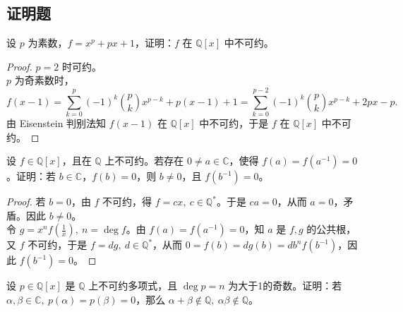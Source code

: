 \documentclass[lang=cn,12pt]{elegantbook}
\begin{document}
\subsection{证明题}
\begin{example}
    设 \( p \) 为素数，\( f = x^p + px + 1 \)，证明：\( f \) 在 \( \mathbb{Q}[x] \) 中不可约。
\end{example}

\begin{proof}
     \( p = 2 \) 时可约。\\
    \( p \) 为奇素数时，
    \[
    f(x-1) = \sum_{k=0}^{p}(-1)^k \binom{p}{k}x^{p-k} + p(x-1) + 1 = \sum_{k=0}^{p-2}(-1)^k \binom{p}{k}x^{p-k} + 2px - p.
    \]
    由 Eisenstein 判别法知 \( f(x-1) \) 在 \( \mathbb{Q}[x] \) 中不可约，于是 \( f \) 在 \( \mathbb{Q}[x] \) 中不可约。
\end{proof}

\begin{example}
    设 \( f \in \mathbb{Q}[x] \)，且在 \( \mathbb{Q} \) 上不可约。若存在 \( 0 \neq a \in \mathbb{C} \)，使得 \( f(a) = f(a^{-1}) = 0 \)。证明：若 \( b \in \mathbb{C} \)，\( f(b) = 0 \)，则 \( b \neq 0 \)，且 \( f(b^{-1}) = 0 \)。
\end{example}

\begin{proof}
    若 \( b = 0 \)，由 \( f \) 不可约，得 \( f = cx,\ c \in \mathbb{Q}^* \)。于是 \( ca = 0 \)，从而 \( a = 0 \)，矛盾。因此 \( b \neq 0 \)。\\
    令 \( g = x^n f\left( \frac{1}{x} \right),\ n = \deg f \)。由 \( f(a) = f(a^{-1}) = 0 \)，知 \( a \) 是 \( f, g \) 的公共根，又 \( f \) 不可约，于是 \( f = dg,\ d \in \mathbb{Q}^* \)，从而 \( 0 = f(b) = dg(b) = db^n f(b^{-1}) \)，因此 \( f(b^{-1}) = 0 \)。
\end{proof}

\begin{example}
    设 \( p \in \mathbb{Q}[x] \) 是 \( \mathbb{Q} \) 上不可约多项式，且 \( \deg p = n \) 为大于1的奇数。证明：若 \( \alpha, \beta \in \mathbb{C},\ p(\alpha) = p(\beta) = 0 \)，那么 \( \alpha + \beta \notin \mathbb{Q},\ \alpha \beta \notin \mathbb{Q} \)。
\end{example}
\end{document}
